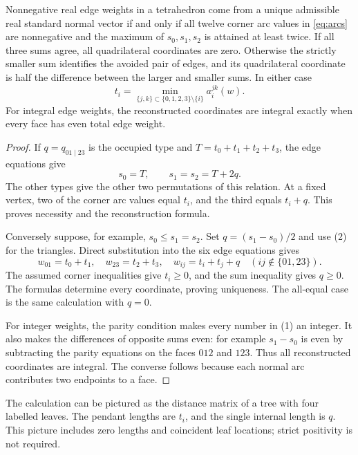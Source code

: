 \begin{lemma}
\label{lem:local}
Nonnegative real edge weights in a tetrahedron come from a unique
admissible real standard normal vector if and only if all twelve corner
arc values in \eqref{eq:arcs} are nonnegative and the maximum of
$s_0,s_1,s_2$ is attained at least twice. If all three sums agree, all
quadrilateral coordinates are zero. Otherwise the strictly smaller sum
identifies the avoided pair of edges, and its quadrilateral coordinate is
half the difference between the larger and smaller sums. In either case
\[
                    t_i=\min_{\{j,k\}\subset\{0,1,2,3\}\setminus\{i\}}
                              a_i^{jk}(w).                 \tag{2}\label{eq:triangles}
\]
For integral edge weights, the reconstructed coordinates are integral
exactly when every face has even total edge weight.
\end{lemma}
\begin{proof}
If $q=q_{01\mid23}$ is the occupied type and $T=t_0+t_1+t_2+t_3$,
the edge equations give
\[
                    s_0=T,\qquad s_1=s_2=T+2q.
\]
The other types give the other two permutations of this relation. At a
fixed vertex, two of the corner arc values equal $t_i$, and the third
equals $t_i+q$. This proves necessity and the reconstruction formula.

Conversely suppose, for example, $s_0\le s_1=s_2$. Set
$q=(s_1-s_0)/2$ and use (2) for the triangles. Direct substitution into
the six edge equations gives
\[
 w_{01}=t_0+t_1,\quad w_{23}=t_2+t_3,\quad
 w_{ij}=t_i+t_j+q\quad(ij\notin\{01,23\}).
\]
The assumed corner inequalities give $t_i\ge0$, and the sum inequality
gives $q\ge0$. The formulas determine every coordinate, proving uniqueness.
The all-equal case is the same calculation with $q=0$.

For integer weights, the parity condition makes every number in (1)
an integer. It also makes the differences of opposite sums even: for
example $s_1-s_0$ is even by subtracting the parity equations on the faces
$012$ and $123$. Thus all reconstructed coordinates are integral.
The converse follows because each normal arc contributes two endpoints
to a face.
\end{proof}

The calculation can be pictured as the distance matrix of a tree with
four labelled leaves. The pendant lengths are $t_i$, and the single
internal length is $q$. This picture includes zero lengths and coincident
leaf locations; strict positivity is not required.

